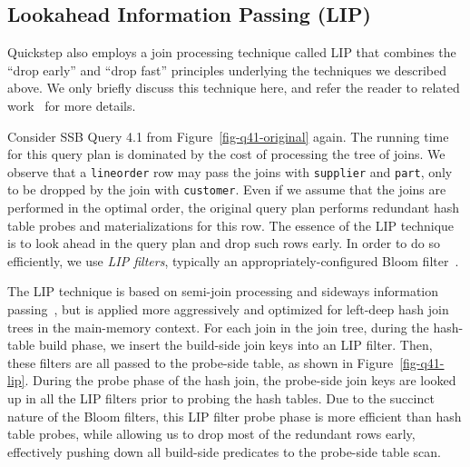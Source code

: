 \subsection{Lookahead Information Passing (LIP)} \label{sec:lip}
Quickstep also employs a join processing technique called LIP that combines the ``drop early'' and ``drop fast'' principles underlying the techniques we described above. We only briefly discuss this technique here, and refer the reader to related work~\cite{zhu2017looking} for more details.

Consider SSB Query 4.1 from Figure~\ref{fig-q41-original} again. The running time for this query plan is dominated by the cost of processing the tree of joins. We observe that a \texttt{lineorder} row may pass the joins with \texttt{supplier} and \texttt{part}, only to be dropped by the join with \texttt{customer}. Even if we assume that the joins are performed in the optimal order, the original query plan performs redundant hash table probes and materializations for this row. The essence of the LIP technique is to look ahead in the query plan and drop such rows early. In order to do so efficiently, we use \emph{LIP filters}, typically an appropriately-configured Bloom filter~\cite{Bloom70Space}.


The LIP technique is based on semi-join processing and sideways information passing~\cite{Bernstein1981SemiJoin, Ives2008Sideways, Beeri1987Magic}, but is applied more aggressively and optimized for left-deep hash join trees in the main-memory context. For each join in the join tree, during the hash-table build phase, we insert the build-side join keys into an LIP filter. Then, these filters are all passed to the probe-side table, as shown in Figure~\ref{fig-q41-lip}. During the probe phase of the hash join, the probe-side join keys are looked up in all the LIP filters prior to probing the hash tables. Due to the succinct nature of the Bloom filters, this LIP filter probe phase is more efficient than hash table probes, while allowing us to drop most of the redundant rows early, %
effectively pushing down all build-side predicates to the probe-side table scan.

